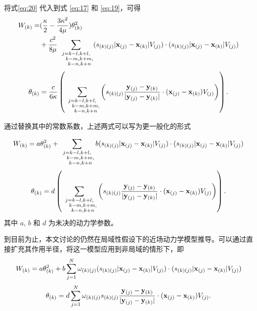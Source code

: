 {{将式\ref{eq:20} 代入到式 \ref{eq:17} 和 \ref{eq:19}，可得
\begin{equation}
\begin{aligned}
W_{(k)} =& (\frac{\kappa}{2} -\frac{3\kappa^2}{4\mu})\theta_{(k)}^2 \\
         &+\frac{c^2}{8\mu}\sum_{\substack {j=k-l,k+l,\\ \quad k-m,k+m,\\ \quad k-n,k+n}}(s_{(k)(j)}|\mathbf{x}_{(j)}-\mathbf{x}_{(k)}|V_{(j)})\cdot(s_{(k)(j)}|\mathbf{x}_{(j)}-\mathbf{x}_{(k)}|V_{(j)})
\end{aligned}
\label{eq:22}
\end{equation}
\begin{equation}
\theta_{(k)} = \frac{c}{6\kappa}\left(\sum_{\substack {j=k-l,k+l,\\ \quad k-m,k+m,\\ \quad k-n,k+n}}\left(s_{(k)(j)}\frac{\mathbf{y}_{(j)} - \mathbf{y}_{(k)}}{|\mathbf{y}_{(j)} - \mathbf{y}_{(k)}|}\cdot(\mathbf{x}_{(j)}-\mathbf{x}_{(k)})V_{(j)}\right)\right).
\label{eq:23}
\end{equation}

通过替换其中的常数系数，上述两式可以写为更一般化的形式

\begin{equation}
W_{(k)} = a\theta_{(k)}^2 + \sum_{\substack {j=k-l,k+l,\\ \quad k-m,k+m,\\ \quad k-n,k+n}}b(s_{(k)(j)}|\mathbf{x}_{(j)}-\mathbf{x}_{(k)}|V_{(j)})\cdot(s_{(k)(j)}|\mathbf{x}_{(j)}-\mathbf{x}_{(k)}|V_{(j)})
\label{eq:24}
\end{equation}
\begin{equation}
\theta_{(k)} = d\left(\sum_{\substack {j=k-l,k+l,\\ \quad k-m,k+m,\\ \quad k-n,k+n}}\left(s_{(k)(j)}\frac{\mathbf{y}_{(j)} - \mathbf{y}_{(k)}}{|\mathbf{y}_{(j)} - \mathbf{y}_{(k)}|}\cdot(\mathbf{x}_{(j)}-\mathbf{x}_{(k)})V_{(j)}\right)\right).
\label{eq:25}
\end{equation}
其中 $a$, $b$ 和 $d$ 为未决的动力学参数。

到目前为止，本文讨论的仍然在局域性假设下的近场动力学模型推导。可以通过直接扩充其作用半径，将这一模型应用到非局域的情形下，即
\begin{equation}
W_{(k)} = a\theta_{(k)}^2 + b\sum_{j=1}^{N}\omega_{(k)(j)}(s_{(k)(j)}|\mathbf{x}_{(j)}-\mathbf{x}_{(k)}|V_{(j)})\cdot(s_{(k)(j)}|\mathbf{x}_{(j)}-\mathbf{x}_{(k)}|V_{(j)})
\label{eq:26}
\end{equation}
\begin{equation}
\theta_{(k)} = d\sum_{j=1}^{N}\omega_{(k)(j)}s_{(k)(j)}\frac{\mathbf{y}_{(j)} - \mathbf{y}_{(k)}}{|\mathbf{y}_{(j)} - \mathbf{y}_{(k)}|}\cdot(\mathbf{x}_{(j)}-\mathbf{x}_{(k)})V_{(j)}.
\label{eq:27}
\end{equation}

}}
